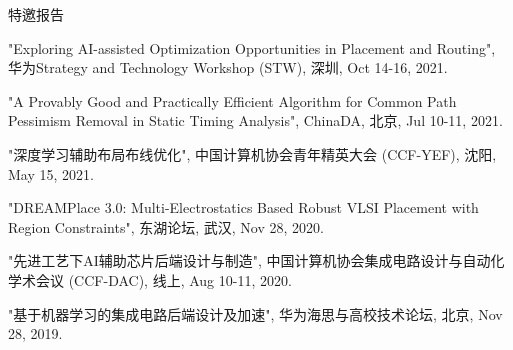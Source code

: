 \begin{rSection}{特邀报告}
\begin{description}[font=\normalfont]
\item[{[T6]}]{
"Exploring AI-assisted Optimization Opportunities in Placement and Routing", 华为Strategy and Technology Workshop (STW), 深圳, Oct 14-16, 2021. 
}

\item[{[T5]}]{
"A Provably Good and Practically Efficient Algorithm for Common Path Pessimism Removal in Static Timing Analysis", ChinaDA, 北京, Jul 10-11, 2021. 
}

\item[{[T4]}]{
"深度学习辅助布局布线优化", 中国计算机协会青年精英大会 (CCF-YEF), 沈阳, May 15, 2021. 
}

\item[{[T3]}]{
"DREAMPlace 3.0: Multi-Electrostatics Based Robust VLSI Placement with Region Constraints", 东湖论坛, 武汉, Nov 28, 2020.
}

\item[{[T2]}]{
"先进工艺下AI辅助芯片后端设计与制造", 中国计算机协会集成电路设计与自动化学术会议 (CCF-DAC), 线上, Aug 10-11, 2020. 
}

\item[{[T1]}]{
"基于机器学习的集成电路后端设计及加速", 华为海思与高校技术论坛, 北京, Nov 28, 2019. 
}

\end{description}
\end{rSection}
